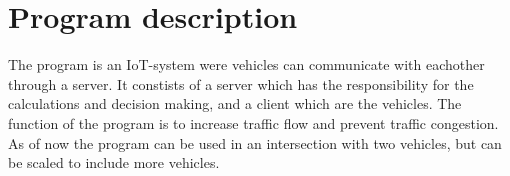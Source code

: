 \section{Program description}

The program is an IoT-system were vehicles can communicate with eachother through a server. It constists of a server which has the responsibility for the calculations and decision making, and a client which are the vehicles. The function of the program is to increase traffic flow and prevent traffic congestion. As of now the program can be used in an intersection with two vehicles, but can be scaled to include more vehicles.

